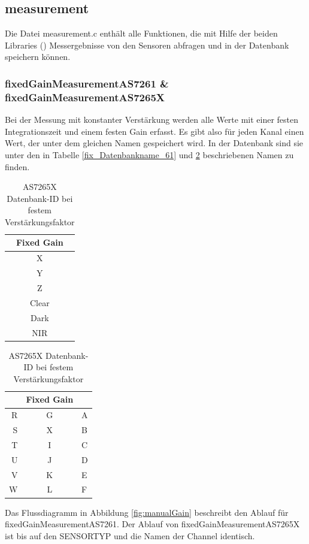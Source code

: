 \subsection{measurement}\label{measurement-c}
Die Datei measurement.c enthält alle Funktionen, die mit Hilfe der beiden Libraries () Messergebnisse von den Sensoren abfragen und in der Datenbank speichern können.


\subsubsection{fixedGainMeasurementAS7261 \& fixedGainMeasurementAS7265X}
Bei der Messung mit konstanter Verstärkung werden alle Werte mit einer festen Integrationszeit und einem festen Gain erfasst. Es gibt also für jeden Kanal einen Wert, der unter dem gleichen Namen gespeichert wird. In der Datenbank sind sie unter den in Tabelle \ref{fix_Datenbankname_61} und \ref{fix_Datenbankname_65} beschriebenen Namen zu finden.

\begin{table}[H]
\parbox{.45\linewidth}{
\centering
\begin{tabular}{ c }
Fixed Gain \\
\hline
X \\ 
Y  \\
Z  \\
Clear \\ 
Dark \\ 
NIR \\ 
\end{tabular}
\caption{AS7261 Datenbank-ID bei festem Verstärkungsfaktor}
\label{fix_Datenbankname_61}

}
\hfill
\parbox{.45\linewidth}{
\centering
\begin{tabular}{ r c l}
&Fixed Gain \\
\hline
 	R & G & A \\  
 	S & X & B \\
 	T & I & C \\  
 	U & J & D \\
 	V & K & E \\  
 	W & L & F \\

\end{tabular}
\caption{AS7265X Datenbank-ID bei festem Verstärkungsfaktor}
\label{fix_Datenbankname_65}
}
\end{table}




\noindent Das Flussdiagramm in Abbildung \ref{fig:manualGain} beschreibt den Ablauf für fixedGainMeasurementAS7261.
Der Ablauf von fixedGainMeasurementAS7265X ist bis auf den SENSORTYP und die Namen der Channel identisch.

